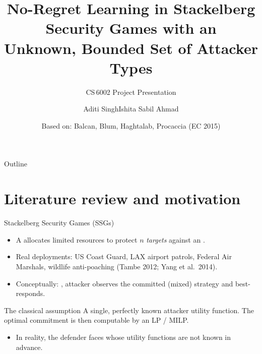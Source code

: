 \documentclass[10pt,aspectratio=169]{beamer}
\title[No-Regret SSGs, Unknown Attackers]%
      {No-Regret Learning in Stackelberg Security Games with an\\
       Unknown, Bounded Set of Attacker Types}
\subtitle{CS\,6002 Project Presentation}
\author[Aditi, Sabil, Ishita]{Aditi Singh\newline Ishita \newline Sabil Ahmad}
\institute[IIT Bombay]{IIT Bombay}
\date{\footnotesize Based on: Balcan, Blum, Haghtalab, Procaccia (EC 2015)}
\newcommand{\impterm}[1]{\textbf{\color{blueprimary}{#1}}}
\newcommand{\impcompterm}[1]{\textbf{\color{darkgreen}{#1}}}
\newenvironment{greenblock}[1]{\begin{exampleblock}{#1}}{\end{exampleblock}}
\begin{document}
\begin{frame}
  \titlepage
\end{frame}

\begin{frame}{Outline}
  \tableofcontents
\end{frame}


\section{Literature review and motivation}

\begin{frame}{Stackelberg Security Games (SSGs)}
\begin{itemize}
  \item A \impterm{defender} allocates limited resources to protect $n$ \emph{targets} against an \impterm{attacker}.
  \item Real deployments: US Coast Guard, LAX airport patrols, Federal Air Marshals, wildlife anti-poaching (Tambe 2012; Yang et al.\ 2014).
  \item Conceptually: \impcompterm{defender commits first}, attacker observes the committed (mixed) strategy and best-responds.
\end{itemize}
\pause
\begin{greenblock}{The classical assumption}
A single, perfectly known attacker utility function. The optimal commitment is then computable by an LP / MILP.
\end{greenblock}
\pause
\begin{itemize}
  \item In reality, the defender faces \impterm{many possible attacker types} whose utility functions are not known in advance.
\end{itemize}
\end{frame}
\end{document}

